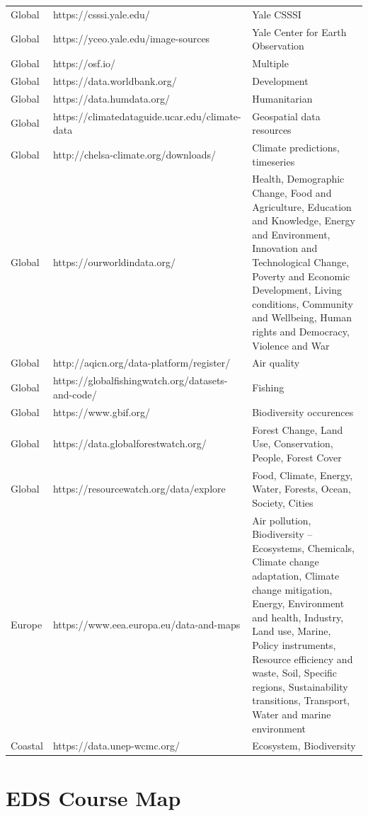 \documentclass[
]{book}
\begin{document}
\begin{tabular}{lll}
Global & https://csssi.yale.edu/ & Yale CSSSI\\
Global & https://yceo.yale.edu/image-sources & Yale Center for Earth Observation\\
Global & https://osf.io/ & Multiple\\
\addlinespace
Global & https://data.worldbank.org/ & Development\\
Global & https://data.humdata.org/ & Humanitarian\\
Global & https://climatedataguide.ucar.edu/climate-data & Geospatial data resources\\
Global & http://chelsa-climate.org/downloads/ & Climate predictions, timeseries\\
Global & https://ourworldindata.org/ & Health, Demographic Change, Food and Agriculture, Education and Knowledge, Energy and Environment, Innovation and Technological Change, Poverty and Economic Development, Living conditions, Community and Wellbeing, Human rights and Democracy, Violence and War\\
\addlinespace
Global & http://aqicn.org/data-platform/register/ & Air quality\\
Global & https://globalfishingwatch.org/datasets-and-code/ & Fishing\\
Global & https://www.gbif.org/ & Biodiversity occurences\\
Global & https://data.globalforestwatch.org/ & Forest Change, Land Use, Conservation, People, Forest Cover\\
Global & https://resourcewatch.org/data/explore & Food, Climate, Energy, Water, Forests, Ocean, Society, Cities\\
\addlinespace
Europe & https://www.eea.europa.eu/data-and-maps & Air pollution, Biodiversity – Ecosystems, Chemicals, Climate change adaptation, Climate change mitigation, Energy, Environment and health, Industry, Land use, Marine, Policy instruments, Resource efficiency and waste, Soil, Specific regions, Sustainability transitions, Transport, Water and marine environment\\
Coastal & https://data.unep-wcmc.org/ & Ecosystem, Biodiversity\\
\bottomrule
\end{tabular}

\hypertarget{eds-course-map}{%
\section{EDS Course Map}\label{eds-course-map}}
\end{document}
